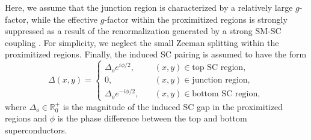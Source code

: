 \documentclass[twocolumn,aps,prb,nofootinbib]{revtex4-2}
\begin{document}
Here, we assume that the junction region is characterized by a relatively large $g$-factor, while the effective $g$-factor within the proximitized regions is strongly suppressed as a result of the renormalization generated by a strong SM-SC coupling \cite{Stanescu2017a}. For simplicity, we neglect the small Zeeman splitting within the proximitized regions.
Finally, the induced SC pairing is assumed to have the form
\begin{equation}
    \Delta(x,y) = 
    \begin{cases}
    \Delta_o e^{i\phi/2},\quad&(x,y)\in\text{top SC region}, \\
    0,\quad&(x,y)\in\text{junction region}, \\
    \Delta_o e^{-i\phi/2},\quad&(x,y)\in\text{bottom SC region},
    \end{cases} \label{Delta}
\end{equation}
where $\Delta_o \in \mathbb{R}^+_0$ is the magnitude of the induced SC gap in the proximitized regions and $\phi$ is the phase difference between the top and bottom superconductors. 
\end{document}
